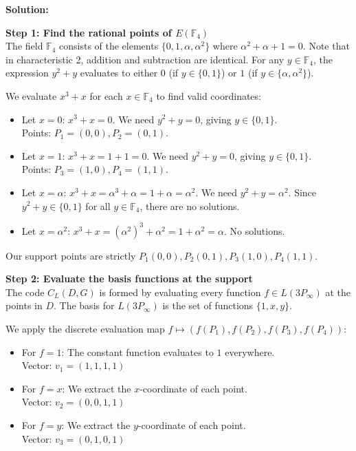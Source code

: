 \documentclass[11pt]{article}
\begin{document}
	\vspace{0.5cm}
	
	\begin{mdframed}[backgroundcolor=gray!5, linecolor=gray!50, linewidth=1pt]
		\textbf{Solution:}
		
		\vspace{0.3cm}
		\textbf{Step 1: Find the rational points of $E(\mathbb{F}_4)$} \\
		The field $\mathbb{F}_4$ consists of the elements $\{0, 1, \alpha, \alpha^2\}$ where $\alpha^2 + \alpha + 1 = 0$. Note that in characteristic 2, addition and subtraction are identical. For any $y \in \mathbb{F}_4$, the expression $y^2 + y$ evaluates to either $0$ (if $y \in \{0, 1\}$) or $1$ (if $y \in \{\alpha, \alpha^2\}$). 
		
		We evaluate $x^3 + x$ for each $x \in \mathbb{F}_4$ to find valid coordinates:
		\begin{itemize}
			\item Let $x = 0$: $x^3 + x = 0$. We need $y^2 + y = 0$, giving $y \in \{0, 1\}$. 
			\\ Points: $P_1 = (0,0), P_2 = (0,1)$.
			\item Let $x = 1$: $x^3 + x = 1 + 1 = 0$. We need $y^2 + y = 0$, giving $y \in \{0, 1\}$. 
			\\ Points: $P_3 = (1,0), P_4 = (1,1)$.
			\item Let $x = \alpha$: $x^3 + x = \alpha^3 + \alpha = 1 + \alpha = \alpha^2$. We need $y^2 + y = \alpha^2$. Since $y^2 + y \in \{0, 1\}$ for all $y \in \mathbb{F}_4$, there are no solutions.
			\item Let $x = \alpha^2$: $x^3 + x = (\alpha^2)^3 + \alpha^2 = 1 + \alpha^2 = \alpha$. No solutions.
		\end{itemize}
		Our support points are strictly $P_1(0,0), P_2(0,1), P_3(1,0), P_4(1,1)$.
		
		\vspace{0.3cm}
		\textbf{Step 2: Evaluate the basis functions at the support} \\
		The code $C_L(D, G)$ is formed by evaluating every function $f \in L(3P_\infty)$ at the points in $D$. The basis for $L(3P_\infty)$ is the set of functions $\{1, x, y\}$. 
		
		We apply the discrete evaluation map $f \mapsto (f(P_1), f(P_2), f(P_3), f(P_4))$:
		\begin{itemize}
			\item For $f = 1$: The constant function evaluates to $1$ everywhere.
			\\ Vector: $v_1 = (1, 1, 1, 1)$
			\item For $f = x$: We extract the $x$-coordinate of each point.
			\\ Vector: $v_2 = (0, 0, 1, 1)$
			\item For $f = y$: We extract the $y$-coordinate of each point.
			\\ Vector: $v_3 = (0, 1, 0, 1)$
		\end{itemize}
		

\end{mdframed}
\end{document}
